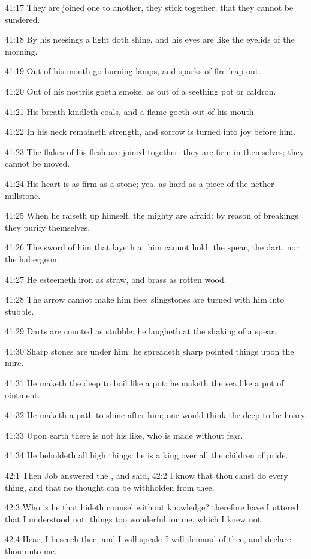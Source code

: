 41:17 They are joined one to another, they stick together, that they
cannot be sundered.

41:18 By his neesings a light doth shine, and his eyes are like the
eyelids of the morning.

41:19 Out of his mouth go burning lamps, and sparks of fire leap out.

41:20 Out of his nostrils goeth smoke, as out of a seething pot or
caldron.

41:21 His breath kindleth coals, and a flame goeth out of his mouth.

41:22 In his neck remaineth strength, and sorrow is turned into joy
before him.

41:23 The flakes of his flesh are joined together: they are firm in
themselves; they cannot be moved.

41:24 His heart is as firm as a stone; yea, as hard as a piece of the
nether millstone.

41:25 When he raiseth up himself, the mighty are afraid: by reason of
breakings they purify themselves.

41:26 The sword of him that layeth at him cannot hold: the spear, the
dart, nor the habergeon.

41:27 He esteemeth iron as straw, and brass as rotten wood.

41:28 The arrow cannot make him flee: slingstones are turned with him
into stubble.

41:29 Darts are counted as stubble: he laugheth at the shaking of a
spear.

41:30 Sharp stones are under him: he spreadeth sharp pointed things
upon the mire.

41:31 He maketh the deep to boil like a pot: he maketh the sea like a
pot of ointment.

41:32 He maketh a path to shine after him; one would think the deep to
be hoary.

41:33 Upon earth there is not his like, who is made without fear.

41:34 He beholdeth all high things: he is a king over all the children
of pride.

42:1 Then Job answered the \LORD, and said, 42:2 I know that thou canst
do every thing, and that no thought can be withholden from thee.

42:3 Who is he that hideth counsel without knowledge? therefore have I
uttered that I understood not; things too wonderful for me, which I
knew not.

42:4 Hear, I beseech thee, and I will speak: I will demand of thee,
and declare thou unto me.

